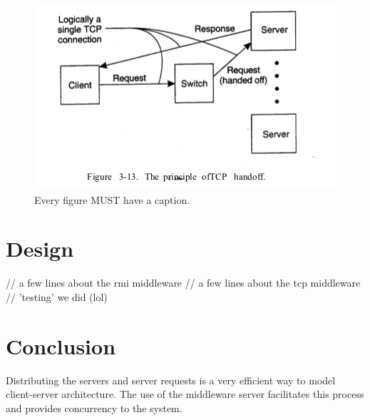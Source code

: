 \documentclass[letterpaper,12pt]{article}
\begin{document}
\begin{figure}[ht] 
	\centering \includegraphics[width=0.8\columnwidth]{figure2.png}
	\caption{
		\label{fig:samplesetup} %
		Every figure MUST have a caption.
	}
\end{figure}



\section{Design}

// a few lines about the rmi middleware
// a few lines about the tcp middleware
// 'testing' we did (lol) 

\section{Conclusion}

Distributing the servers and server requests is a very efficient way to model client-server architecture. The use of the middleware server facilitates this process and provides concurrency to the system. 
\end{document}
